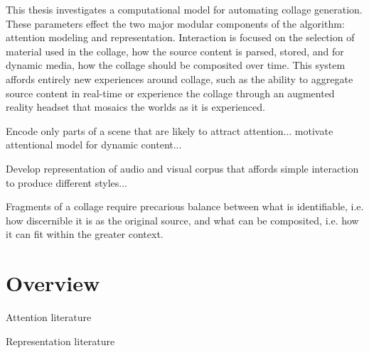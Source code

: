 This thesis investigates a computational model for automating collage generation.  These parameters effect the two major modular components of the algorithm: attention modeling and representation.   Interaction is focused on the selection of material used in the collage, how the source content is parsed, stored, and for dynamic media, how the collage should be composited over time.  This system affords entirely new experiences around collage, such as the ability to aggregate source content in real-time or experience the collage through an augmented reality headset that mosaics the worlds as it is experienced.  

Encode only parts of a scene that are likely to attract attention... motivate attentional model for dynamic content... 

Develop representation of audio and visual corpus that affords simple interaction to produce different styles...

Fragments of a collage require precarious balance between what is identifiable, i.e. how discernible it is as the original source, and what can be composited, i.e. how it can fit within the greater context. 

\section{Overview}
Attention literature

Representation literature
